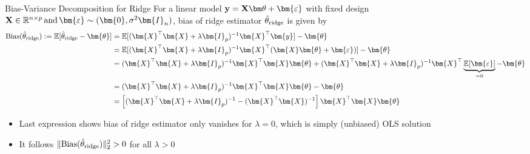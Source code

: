 \documentclass[11pt,compress,t,notes=noshow, xcolor=table]{beamer}
\begin{document}



\begin{vbframe}{Bias-Variance Decomposition for Ridge}
For a linear model $\yv = \Xmat \thetav + \bm{\varepsilon}$ with fixed design $\Xmat \in \mathbb{R}^{n \times p}\,\text{and}\,\bm{\varepsilon} \sim (\bm{0},\sigma^2 \bm{I}_n)$, bias of ridge estimator $\hat{\theta}_{\text{ridge}}$ is given by 
\begin{equation*}
    \begin{aligned}
        \text{Bias}(\thetah_{\text{ridge}}) := \mathbb{E}[\thetah_{\text{ridge}}-\bm{\theta}] &= \mathbb{E}[(\bm{X}^{\top}\bm{X} +\lambda\bm{I}_p )^{-1} \bm{X}^{\top}\bm{y}] - \bm{\theta}\\
        &= \mathbb{E}[(\bm{X}^{\top}\bm{X} +\lambda\bm{I}_p )^{-1} \bm{X}^{\top}(\bm{X}\bm{\theta}+\bm{\varepsilon})] - \bm{\theta} \\
        &= (\bm{X}^{\top}\bm{X} +\lambda\bm{I}_p )^{-1} \bm{X}^{\top} \bm{X} \bm{\theta} + (\bm{X}^{\top}\bm{X} +\lambda\bm{I}_p )^{-1} \bm{X}^{\top} \underbrace{\mathbb{E}[\bm{\varepsilon}]}_{=0} - \bm{\theta} \\
        &= (\bm{X}^{\top}\bm{X} +\lambda\bm{I}_p )^{-1} \bm{X}^{\top} \bm{X} \bm{\theta} - \bm{\theta} \\
        &= \left[(\bm{X}^{\top}\bm{X} +\lambda\bm{I}_p )^{-1} - (\bm{X}^{\top} \bm{X})^{-1} \right] \bm{X}^{\top} \bm{X} \bm{\theta}
        \end{aligned}
    \end{equation*}

\begin{itemize}
    \item Last expression shows bias of ridge estimator only vanishes for $\lambda=0$, which is simply (unbiased) OLS solution
    \item It follows $\Vert \text{Bias}(\hat{\theta}_{\text{ridge}})\Vert_2^2>0$ for all $\lambda>0$
\end{itemize}


\end{vbframe}
\end{document}
